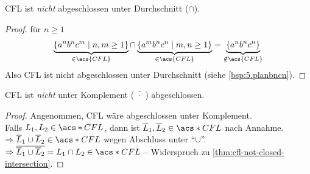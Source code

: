 \begin{Satz}\label{thm:cfl-not-closed-intersection}
  \ac{CFL} ist \emph{nicht} abgeschlossen unter Durchschnitt ($\cap$).
\end{Satz}
\begin{proof}
 für $n\geq 1$
		\[ \underbrace{\{a^nb^nc^m \mid n,m\geq 1 \}}_{\in \acs{CFL}} \cap \underbrace{\{a^mb^nc^n \mid m,n\geq 1 \}}_{\in \acs{CFL}} = \underbrace{\{a^nb^nc^n\}}_{\notin \acs{CFL}} \]
		Also \ac{CFL} ist nicht abgeschlossen unter Durchschnitt
		(siehe \autoref{bsp:5.planbncn}).
\end{proof}


\begin{Satz}
 	\ac{CFL} ist \emph{nicht} unter Komplement
        ($\overline{\!\phantom{i}\cdot\!\phantom{i}}$) abgeschlossen.
\end{Satz}
\begin{proof}
  Angenommen, CFL wäre abgeschlossen unter Komplement.\\
  Falls $L_1,L_2\in \acs*{CFL}$, dann ist $\overline{L}_1,\overline{L}_2\in\acs*{CFL}$ nach Annahme.\\
  $\Rightarrow \overline{L}_1\cup \overline{L}_2\in\acs*{CFL}$ wegen Abschluss unter "`$\cup$"'.\\
  $\Rightarrow \overline{\overline{L}_1\cup \overline{L}_2} = L_1\cap L_2\in\acs*{CFL}$ -- Widerspruch zu \autoref{thm:cfl-not-closed-intersection}. \qedhere 
\end{proof}

